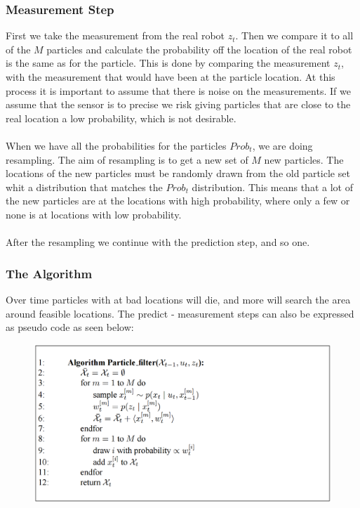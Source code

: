 \subsubsection{Measurement Step}
First we take the measurement from the real robot $z_t$. Then we compare it to all of the $M$ particles and calculate the probability off the location of the real robot is the same as for the particle. This is done by comparing the measurement $z_t$, with the measurement that would have been at the particle location.
At this process it is important to assume that there is noise on the measurements. If we assume that the sensor is to precise we risk giving particles that are close to the real location a low probability, which is not desirable.\\\\
When we have all the probabilities for the particles $Prob_t$, we are doing resampling. The aim of resampling is to get a new set of $M$ new particles. The locations of the new particles must be randomly drawn from the old particle set whit a distribution that matches the $Prob_t$ distribution. This means that a lot of the new particles are at the locations with high probability, where only a few or none is at locations with low probability.\\ 
\\
After the resampling we continue with the prediction step, and so one. 

\subsubsection{The Algorithm}
Over time particles with at bad locations will die, and more will search the area around feasible locations. The predict - measurement steps can also be expressed as pseudo code as seen below: 

\begin{figure}[H]
\includegraphics[scale=0.51]{billeder/ParticleFilter.png}
\end{figure}

